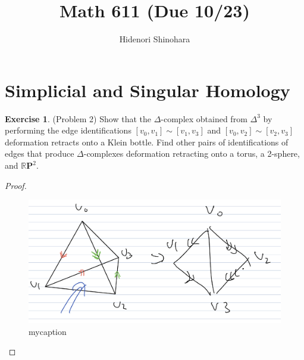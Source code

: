 \documentclass[12pt, psamsfonts]{amsart}
\theoremstyle{definition}
\newtheorem*{exer}{Exercise}
\theoremstyle{remark}
\numberwithin{equation}{section}
\begin{document}
\title{Math 611 (Due 10/23)}
\author{Hidenori Shinohara}
\maketitle

\section{Simplicial and Singular Homology}

\begin{exer}{(Problem 2)}
  Show that the $\Delta$-complex obtained from $\Delta^3$ by performing the edge identifications $[v_0, v_1] \sim [v_1, v_3]$ and $[v_0, v_2] \sim [v_2, v_3]$ deformation retracts onto a Klein bottle.
  Find other pairs of identifications of edges that produce $\Delta$-complexes deformation retracting onto a torus, a 2-sphere, and $\mathbb{R}\mathbf{P}^2$.
\end{exer}

\begin{proof}
  \begin{figure}
  \includegraphics[width=.5\linewidth]{klein_delta3.jpeg}
  \caption{mycaption}
  \label{fig:mylabel}
  \end{figure}
\end{proof}
\end{document}
